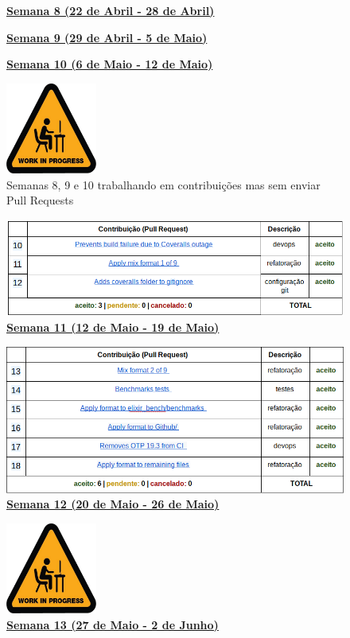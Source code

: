 \begin{figure}
  \caption{\textbf{\underline{Semana 8 (22 de Abril - 28 de Abril)}}}
  \caption{\textbf{\underline{Semana 9 (29 de Abril - 5 de Maio)}}}
  \caption{\textbf{\underline{Semana 10 (6 de Maio - 12 de Maio)}}}
  \centering
  \includegraphics[width=30mm, scale=0.5]{figuras/loading.png}
  \caption{Semanas 8, 9 e 10 trabalhando em contribuições mas sem enviar Pull Requests}
\end{figure}

\begin{figure}
  \caption{\textbf{\underline{Semana 11 (12 de Maio - 19 de Maio)}}}
  \includegraphics[width=\linewidth]{figuras/contribs-7.png}
\end{figure}

\begin{figure}
  \caption{\textbf{\underline{Semana 12 (20 de Maio - 26 de Maio)}}}
  \includegraphics[width=\linewidth]{figuras/contribs-8.png}
\end{figure}

\begin{figure}
  \caption{\textbf{\underline{Semana 13 (27 de Maio - 2 de Junho)}}}
  \centering
  \includegraphics[width=30mm, scale=0.5]{figuras/loading.png}
\end{figure}

